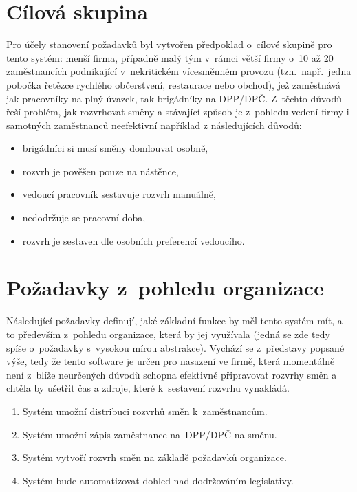 \documentclass[twoside]{ctuthesis}
\begin{document}
\section{Cílová skupina}
Pro účely stanovení požadavků byl vytvořen předpoklad o~cílové skupině pro tento systém: menší firma, případně malý tým v~rámci větší firmy o~10 až 20 zaměstnancích podnikající v~nekritickém vícesměnném provozu (tzn.~např.~jedna pobočka řetězce rychlého občerstvení, restaurace nebo obchod), jež zaměstnává jak pracovníky na plný úvazek, tak brigádníky na DPP/DPČ. Z~těchto důvodů řeší problém, jak rozvrhovat směny a stávající způsob je z~pohledu vedení firmy i samotných zaměstnanců neefektivní například z následujících důvodů:
\begin{itemize}
	\item brigádníci si musí směny domlouvat osobně,
	\item rozvrh je pověšen pouze na nástěnce,
	\item vedoucí pracovník sestavuje rozvrh manuálně,
	\item nedodržuje se pracovní doba,
	\item rozvrh je sestaven dle osobních preferencí vedoucího.
\end{itemize}


\section{Požadavky z~pohledu organizace}

Následující požadavky definují, jaké základní funkce by měl tento systém mít, a to především z~pohledu organizace, která by jej využívala (jedná se zde tedy spíše o~požadavky s~vysokou mírou abstrakce). Vychází se z~představy popsané výše, tedy že tento software je určen pro nasazení ve firmě, která momentálně není z~blíže neurčených důvodů schopna efektivně připravovat rozvrhy směn a chtěla by ušetřit čas a zdroje, které k~sestavení rozvrhu vynakládá.

\begin{enumerate}[label=\textbf{B\arabic*.}]
	\item Systém umožní distribuci rozvrhů směn k~zaměstnancům.
	\item Systém umožní zápis zaměstnance na~DPP/DPČ na směnu.
	\item Systém vytvoří rozvrh směn na základě požadavků organizace.
	\item Systém bude automatizovat dohled nad dodržováním legislativy.
\end{enumerate}
\end{document}
